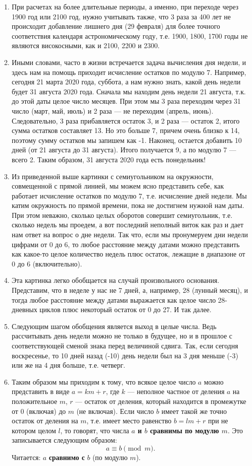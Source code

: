 \begin{enumerate}
\item При расчетах на более длительные периоды, а именно, при переходе через 1900 год или 2100 год, нужно учитывать также, что 3 раза за 400 лет не происходит добавление лишнего дня (29 февраля) для более точного соответствия календаря астрономическому году, т.е. 1900, 1800, 1700 годы не являются високосными, как и 2100, 2200 и 2300.
\item Иными словами, часто в жизни встречается задача вычисления дня недели, и здесь нам на помощь приходит исчисление остатков по модулю 7. Например, сегодня 21 марта 2020 года, суббота, а нам нужно знать, какой день недели будет 31 августа 2020 года. Сначала мы находим день недели 21 августа, т.к. до этой даты целое число месяцев. При этом мы 3 раза переходим через 31 число (март, май, июль) и 2 раза --- не переходим (апрель, июнь). Следовательно, 3 раза прибавляется остаток 3, и 2 раза --- остаток 2, итого сумма остатков составляет 13. Но это больше 7, причем очень близко к 14, поэтому сумму остатков мы запишем как -1. Наконец, остается добавить 10 дней (от 21 августа до 31 августа). Итого получается 9, а по модулю 7 --- всего 2. Таким образом, 31 августа 2020 года есть понедельник!
\item Из приведенной выше картинки с семиугольником на окружности, совмещенной с прямой линией, мы можем ясно представить себе, как работает исчисление остатков по модулю 7, т.е. исчисление дней недели. Мы катим окружность по прямой времени, пока не достигнем нужной нам даты. При этом неважно, сколько целых оборотов совершит семиугольник, т.е. сколько недель мы проедем, а вот последний неполный виток как раз и дает нам ответ на вопрос о дне недели. Так что, если мы пронумеруем дни недели цифрами от 0 до 6, то любое расстояние между датами можно представить как какое-то целое количество недель плюс остаток, лежащие в диапазоне от 0 до 6 (включительно).
\item Эта картинка легко обобщается на случай произвольного основания. Представим, что в неделе у нас не 7 дней, а, например, 28 (лунный месяц), и тогда любое расстояние между датами выражается как целое число 28-дневных циклов плюс некоторый остаток от 0 до 27. И так далее.
\item Следующим шагом обобщения является выход в целые числа. Ведь рассчитывать день недели можно не только в будущее, но и в прошлое с соответствующей сменой знака перед величиной сдвига. Так, если сегодня воскресенье, то 10 дней назад (-10) день недели был на 3 дня меньше (-3) или же на 4 дня больше, т.е. четверг.
\item Таким образом мы приходим к тому, что всякое целое число $a$ можно представить в виде $a=km+r$, где $k$ --- неполное частное от деления $a$ на положительное $m$, $r$ --- остаток от деления, который находится в промежутке от 0 (включая) до $m$ (не включая). Если число $b$ имеет такой же точно остаток от деления на $m$, т.е. имеет место равенство $b=lm+r$ при не котором целом $l$, то говорят, что числа \textbf{$a$ и $b$ сравнимы по модулю $m$}. Это записывается следующим образом:
$$
a\equiv b\pmod m.
$$
Читается: $a$ \textbf{сравнимо с} $b$ (по модулю $m$).


\end{enumerate}
